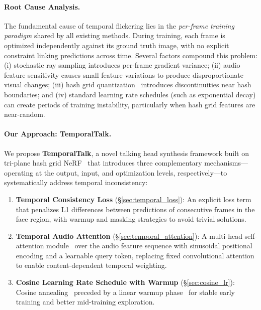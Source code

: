\documentclass[10pt,twocolumn,letterpaper]{article}
\begin{document}
\paragraph{Root Cause Analysis.}
The fundamental cause of temporal flickering lies in the \emph{per-frame training paradigm} shared by all existing methods.
During training, each frame is optimized independently against its ground truth image, with no explicit constraint linking predictions across time.
Several factors compound this problem: (i) stochastic ray sampling introduces per-frame gradient variance; (ii) audio feature sensitivity causes small feature variations to produce disproportionate visual changes; (iii) hash grid quantization~\cite{mueller2022instant} introduces discontinuities near hash boundaries; and (iv) standard learning rate schedules (such as exponential decay) can create periods of training instability, particularly when hash grid features are near-random.

\paragraph{Our Approach: TemporalTalk.}
We propose \textbf{TemporalTalk}, a novel talking head synthesis framework built on tri-plane hash grid NeRF~\cite{mueller2022instant} that introduces three complementary mechanisms---operating at the output, input, and optimization levels, respectively---to systematically address temporal inconsistency:

\begin{enumerate}[nosep,leftmargin=*]
    \item \textbf{Temporal Consistency Loss} (\S\ref{sec:temporal_loss}): An explicit loss term that penalizes L1 differences between predictions of consecutive frames in the face region, with warmup and masking strategies to avoid trivial solutions.

    \item \textbf{Temporal Audio Attention} (\S\ref{sec:temporal_attention}): A multi-head self-attention module~\cite{vaswani2017attention} over the audio feature sequence with sinusoidal positional encoding and a learnable query token, replacing fixed convolutional attention to enable content-dependent temporal weighting.

    \item \textbf{Cosine Learning Rate Schedule with Warmup} (\S\ref{sec:cosine_lr}): Cosine annealing~\cite{loshchilov2017sgdr} preceded by a linear warmup phase~\cite{goyal2017accurate} for stable early training and better mid-training exploration.
\end{enumerate}
\end{document}
